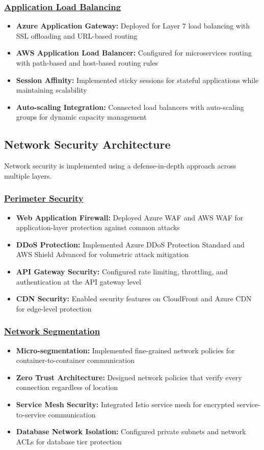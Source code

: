 \subsubsection*{\underline{Application Load Balancing}}
\begin{itemize}
    \item \textbf{Azure Application Gateway:} Deployed for Layer 7 load balancing with SSL offloading and URL-based routing
    \item \textbf{AWS Application Load Balancer:} Configured for microservices routing with path-based and host-based routing rules
    \item \textbf{Session Affinity:} Implemented sticky sessions for stateful applications while maintaining scalability
    \item \textbf{Auto-scaling Integration:} Connected load balancers with auto-scaling groups for dynamic capacity management
\end{itemize}

\subsection{Network Security Architecture}
Network security is implemented using a defense-in-depth approach across multiple layers.

\subsubsection*{\underline{Perimeter Security}}
\begin{itemize}
    \item \textbf{Web Application Firewall:} Deployed Azure WAF and AWS WAF for application-layer protection against common attacks
    \item \textbf{DDoS Protection:} Implemented Azure DDoS Protection Standard and AWS Shield Advanced for volumetric attack mitigation
    \item \textbf{API Gateway Security:} Configured rate limiting, throttling, and authentication at the API gateway level
    \item \textbf{CDN Security:} Enabled security features on CloudFront and Azure CDN for edge-level protection
\end{itemize}

\subsubsection*{\underline{Network Segmentation}}
\begin{itemize}
    \item \textbf{Micro-segmentation:} Implemented fine-grained network policies for container-to-container communication
    \item \textbf{Zero Trust Architecture:} Designed network policies that verify every connection regardless of location
    \item \textbf{Service Mesh Security:} Integrated Istio service mesh for encrypted service-to-service communication
    \item \textbf{Database Network Isolation:} Configured private subnets and network ACLs for database tier protection
\end{itemize}

